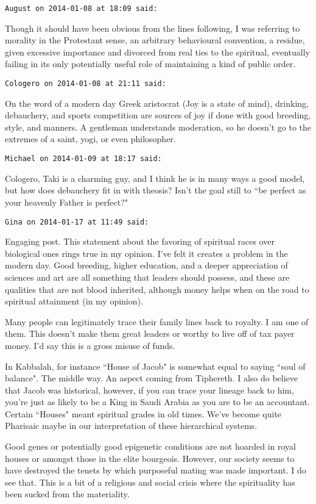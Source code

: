 \begin{footnotesize}
\begin{sffamily}
\texttt{August on 2014-01-08 at 18:09 said: }

Though it should have been obvious from the lines following, I was referring to morality in the Protestant sense, an arbitrary behavioural convention, a residue, given excessive importance and divorced from real ties to the spiritual, eventually failing in its only potentially useful role of maintaining a kind of public order.


\hfill

\texttt{Cologero on 2014-01-08 at 21:11 said: }

On the word of a modern day Greek aristocrat (Joy is a state of mind), drinking, debauchery, and sports competition are sources of joy if done with good breeding, style, and manners. A gentleman understands moderation, so he doesn't go to the extremes of a saint, yogi, or even philosopher.


\hfill

\texttt{Michael on 2014-01-09 at 18:17 said: }

Cologero, Taki is a charming guy, and I think he is in many ways a good model, but how does debauchery fit in with theosis? Isn't the goal still to ``be perfect as your heavenly Father is perfect?"


\hfill

\texttt{Gina on 2014-01-17 at 11:49 said: }

Engaging post. This statement about the favoring of spiritual races over biological ones rings true in my opinion. I've felt it creates a problem in the modern day. Good breeding, higher education, and a deeper appreciation of sciences and art are all something that leaders should possess, and these are qualities that are not blood inherited, although money helps when on the road to spiritual attainment (in my opinion). 

Many people can legitimately trace their family lines back to royalty. I am one of them. This doesn't make them great leaders or worthy to live off of tax payer money. I'd say this is a gross misuse of funds. 

In Kabbalah, for instance ``House of Jacob" is somewhat equal to saying ``soul of balance". The middle way. An aspect coming from Tiphereth. I also do believe that Jacob was historical, however, if you can trace your lineage back to him, you're just as likely to be a King in Saudi Arabia as you are to be an accountant. Certain ``Houses" meant spiritual grades in old times. We've become quite Pharisaic maybe in our interpretation of these hierarchical systems.

Good genes or potentially good epigenetic conditions are not hoarded in royal houses or amongst those in the elite bourgeois. However, our society seems to have destroyed the tenets by which purposeful mating was made important. I do see that. This is a bit of a religious and social crisis where the spirituality has been sucked from the materiality.


\hfill


\hfill


\hfill


\end{sffamily}\end{footnotesize}
